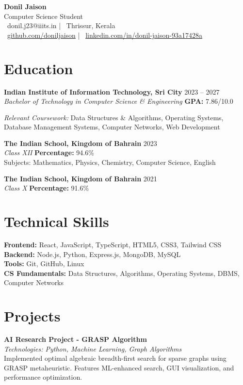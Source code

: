 \documentclass[11pt,a4paper]{article}
\newcommand{\resumeheader}[4]{
    \begin{center}
        {\Huge\bfseries\color{primaryblue} #1} \\
        \vspace{0.25em}
        {#2} \\
        \vspace{0.25em}
        \faEnvelope\ #3 \quad | \quad \faMapMarker\ #4 \\
        \faGithub\ \href{https://github.com/doniljaison}{github.com/doniljaison} \quad | \quad
        \faLinkedin\ \href{https://linkedin.com/in/donil-jaison-93a17428a}{linkedin.com/in/donil-jaison-93a17428a}
    \end{center}
    \vspace{0.2em} %
}
\begin{document}
\resumeheader
{Donil Jaison}
{Computer Science Student}
{donil.j23@iiits.in}
{Thrissur, Kerala}

\section*{Education}
\noindent %
\textbf{Indian Institute of Information Technology, Sri City} \hfill 2023 -- 2027 \\
\textit{Bachelor of Technology in Computer Science \& Engineering} \hfill \textbf{GPA:} 7.86/10.0 \\
\parbox[t]{0.9\textwidth}{\textit{Relevant Coursework:} Data Structures \& Algorithms, Operating Systems, Database Management Systems, Computer Networks, Web Development}
\vspace{0.8em} %

\noindent %
\textbf{The Indian School, Kingdom of Bahrain} \hfill 2023 \\
\textit{Class XII} \hfill \textbf{Percentage:} 94.6\% \\
Subjects: Mathematics, Physics, Chemistry, Computer Science, English
\vspace{0.8em} %

\noindent %
\textbf{The Indian School, Kingdom of Bahrain} \hfill 2021 \\
\textit{Class X} \hfill \textbf{Percentage:} 91.6\% \\

\section*{Technical Skills}
\textbf{Frontend:} React, JavaScript, TypeScript, HTML5, CSS3, Tailwind CSS \\[3pt]
\textbf{Backend:} Node.js, Python, Express.js, MongoDB, MySQL \\[3pt]
\textbf{Tools:} Git, GitHub, Linux \\[3pt]
\textbf{CS Fundamentals:} Data Structures, Algorithms, Operating Systems, DBMS, Computer Networks

\section*{Projects}
\noindent %
\textbf{AI Research Project - GRASP Algorithm} \\
\textit{Technologies: Python, Machine Learning, Graph Algorithms} \\
Implemented optimal algebraic breadth-first search for sparse graphs using GRASP metaheuristic. Features ML-enhanced search, GUI visualization, and performance optimization.
\vspace{0.8em} %
\end{document}
